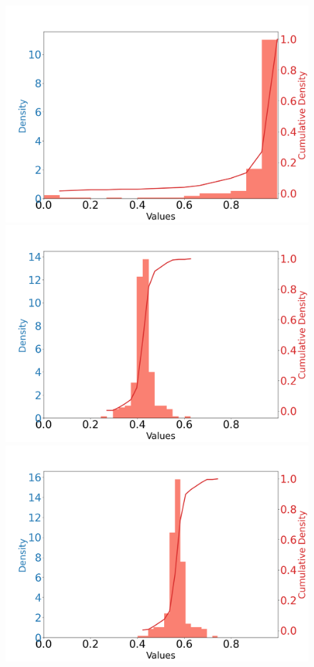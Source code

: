 \documentclass{article}
\begin{document}
\begin{figure}[htbp]
\begin{minipage}{0.195\textwidth}
    \includegraphics[scale=0.08]{figures/shot_density_idx_35_XCoord:-56.64_YCoord:-7.79.png}
    \end{minipage}
    \begin{minipage}{0.195\textwidth}
    \centering
    \includegraphics[scale=0.08]{figures/carry_density_idx_0_XCoord:0.19_YCoord:-38.47.png}
    \end{minipage}
    \begin{minipage}{0.195\textwidth}
    \centering
    \includegraphics[scale=0.08]{figures/carry_density_idx_24_XCoord:-25.46_YCoord:-10.31.png}

\end{minipage}
\end{figure}
\end{document}
